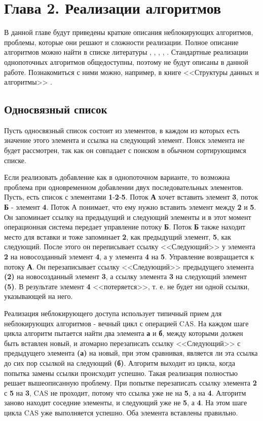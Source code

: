 \documentclass[12pt]{article}
\begin{document}
{		\newpage
		
		\section{Глава 2. Реализации алгоритмов}
			\par В данной главе будут приведены краткие описания неблокирующих алгоритмов, проблемы, которые они решают и сложности реализации. Полное описание алгоритмов можно найти в списке литературы \cite{LinkedList}, \cite{ListSkipList}, \cite{ListAndSkipList}, \cite{HashTable}, \cite{artOfMultiprocessor}. Стандартные реализации однопоточных алгоритмов общедоступны, поэтому не будут описаны в данной работе. Познакомиться с ними можно, например, в книге <<Структуры данных и алгоритмы>> \cite{dataStructures}.
			\subsection{Односвязный список}
				\par Пусть односвязный список состоит из элементов, в каждом из которых есть значение этого элемента и ссылка на следующий элемент. Поиск элемента не будет рассмотрен, так как он совпадает с поиском в обычном сортирующимся списке.
				\par Если реализовать добавление как в однопоточном варианте, то возможна проблема при одновременном добавлении двух последовательных элементов. Пусть, есть список с элементами \textbf{1}-\textbf{2}-\textbf{5}. Поток \textbf{А} хочет вставить элемент \textbf{3}, поток \textbf{Б} - элемент \textbf{4}. Поток А понимает, что ему нужно вставить элемент между \textbf{2} и \textbf{5}. Он запоминает ссылку на предыдущий и следующий элементы и в этот момент операционная система передает управление потоку \textbf{Б}. Поток \textbf{Б} также находит место для вставки и тоже запоминает \textbf{2}, как предыдущий элемент, \textbf{5}, как следующий. После этого он переписывает ссылку <<Следующий>> у элемента \textbf{2} на новосозданный элемент \textbf{4}, а у элемента \textbf{4} на \textbf{5}. Управление возвращается к потоку \textbf{А}. Он перезаписывает ссылку <<Следующий>> предыдущего элемента \textbf{(2)} на новосозданный элемент \textbf{3}, а ссылку элемента \textbf{3} на следующий элемент \textbf{(5)}. В результате элемент \textbf{4} <<потеряется>>, т. е. не будет ни одной ссылки, указывающей на него.
				\par Реализация неблокирующего доступа использует типичный прием для неблокирующих алгоритмов - вечный цикл с операцией CAS. На каждом шаге цикла алгоритм пытается найти два элемента \textbf{а} и \textbf{б}, между которыми должен быть вставлен новый, и атомарно перезаписать ссылку <<Следующий>> с предыдущего элемента \textbf{(а)} на новый, при этом сравнивая, является ли эта ссылка до сих пор ссылкой на следующий \textbf{(б)}. Алгоритм выходит из цикла, когда попытка замены ссылки происходит успешно. Такая реализация полностью решает вышеописанную проблему. При попытке перезаписать ссылку элемента \textbf{2} с \textbf{5} на \textbf{3}, CAS не проходит, потому что ссылка уже не на \textbf{5}, а на \textbf{4}. Алгоритм заново находит соседние элементы, и следующий уже не \textbf{5}, а \textbf{4}. На этом шаге цикла CAS уже выполняется успешно. Оба элемента вставлены правильно.
}
\end{document}
